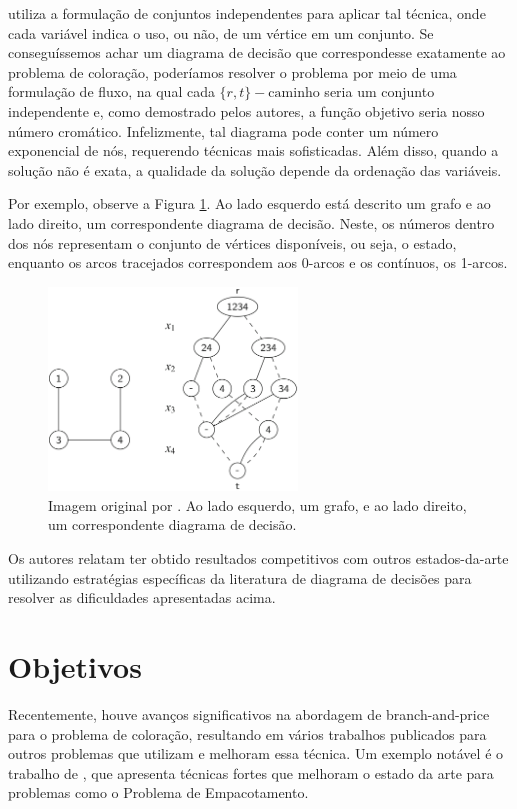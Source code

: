 \documentclass[11pt]{article}
\begin{document}
\textcite{Hoeve2021Graphcoloringdecision} utiliza a formulação de conjuntos independentes para aplicar tal técnica, onde cada variável indica o uso, ou não, de um vértice em um conjunto.
Se conseguíssemos achar um diagrama de decisão que correspondesse exatamente ao problema de coloração, poderíamos resolver o problema por meio de uma formulação de fluxo, na qual cada \(\{r,t\}-\text{caminho}\) seria um conjunto independente e, como demostrado pelos autores, a função objetivo seria nosso número cromático.
Infelizmente, tal diagrama pode conter um número exponencial de nós, requerendo técnicas mais sofisticadas.
Além disso, quando a solução não é exata, a qualidade da solução depende da ordenação das variáveis.

Por exemplo, observe a Figura \ref{fig:diagrama_decisao}.
Ao lado esquerdo está descrito um grafo e ao lado direito, um correspondente diagrama de decisão.
Neste, os números dentro dos nós representam o conjunto de vértices disponíveis, ou seja, o estado, enquanto os arcos tracejados correspondem aos 0-arcos e os contínuos, os 1-arcos.

\begin{figure}[htbp]
\centering
\includegraphics[width=250px]{./diagrama_decisao.png}
\caption{\label{fig:diagrama_decisao}Imagem original por \textcite{Hoeve2021Graphcoloringdecision}. Ao lado esquerdo, um grafo, e ao lado direito, um correspondente diagrama de decisão.}
\end{figure}

Os autores relatam ter obtido resultados competitivos com outros estados-da-arte utilizando estratégias específicas da literatura de diagrama de decisões para resolver as dificuldades apresentadas acima.

\section{Objetivos}
\label{sec:orgf370807}
Recentemente, houve avanços significativos na abordagem de branch-and-price para o problema de coloração, resultando em vários trabalhos publicados para outros problemas que utilizam e melhoram essa técnica. Um exemplo notável é o trabalho de \textcite{Lima2022Exactsolutionnetwork}, que apresenta técnicas fortes que melhoram o estado da arte para problemas como o Problema de Empacotamento.
\end{document}
